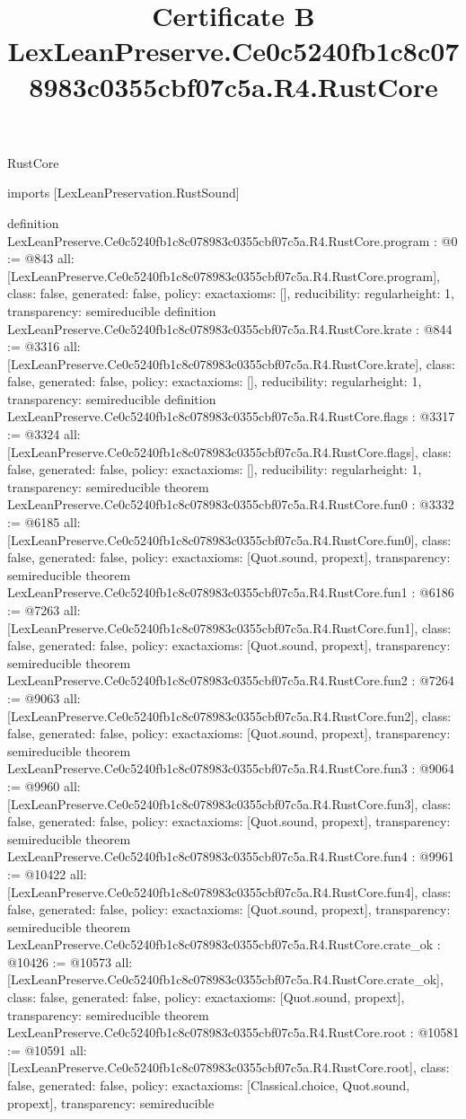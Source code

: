 \begin{lexlean}{RustCore}
\title{Certificate B LexLeanPreserve.Ce0c5240fb1c8c078983c0355cbf07c5a.R4.RustCore}
\begin{coremodule}
imports [LexLeanPreservation.RustSound]

definition LexLeanPreserve.Ce0c5240fb1c8c078983c0355cbf07c5a.R4.RustCore.program : @0 := @843 {
  all: [LexLeanPreserve.Ce0c5240fb1c8c078983c0355cbf07c5a.R4.RustCore.program],
  class: false,
  generated: false,
  policy: exact{axioms: []},
  reducibility: regular{height: 1},
  transparency: semireducible
}
definition LexLeanPreserve.Ce0c5240fb1c8c078983c0355cbf07c5a.R4.RustCore.krate : @844 := @3316 {
  all: [LexLeanPreserve.Ce0c5240fb1c8c078983c0355cbf07c5a.R4.RustCore.krate],
  class: false,
  generated: false,
  policy: exact{axioms: []},
  reducibility: regular{height: 1},
  transparency: semireducible
}
definition LexLeanPreserve.Ce0c5240fb1c8c078983c0355cbf07c5a.R4.RustCore.flags : @3317 := @3324 {
  all: [LexLeanPreserve.Ce0c5240fb1c8c078983c0355cbf07c5a.R4.RustCore.flags],
  class: false,
  generated: false,
  policy: exact{axioms: []},
  reducibility: regular{height: 1},
  transparency: semireducible
}
theorem LexLeanPreserve.Ce0c5240fb1c8c078983c0355cbf07c5a.R4.RustCore.fun0 : @3332 := @6185 {
  all: [LexLeanPreserve.Ce0c5240fb1c8c078983c0355cbf07c5a.R4.RustCore.fun0],
  class: false,
  generated: false,
  policy: exact{axioms: [Quot.sound, propext]},
  transparency: semireducible
}
theorem LexLeanPreserve.Ce0c5240fb1c8c078983c0355cbf07c5a.R4.RustCore.fun1 : @6186 := @7263 {
  all: [LexLeanPreserve.Ce0c5240fb1c8c078983c0355cbf07c5a.R4.RustCore.fun1],
  class: false,
  generated: false,
  policy: exact{axioms: [Quot.sound, propext]},
  transparency: semireducible
}
theorem LexLeanPreserve.Ce0c5240fb1c8c078983c0355cbf07c5a.R4.RustCore.fun2 : @7264 := @9063 {
  all: [LexLeanPreserve.Ce0c5240fb1c8c078983c0355cbf07c5a.R4.RustCore.fun2],
  class: false,
  generated: false,
  policy: exact{axioms: [Quot.sound, propext]},
  transparency: semireducible
}
theorem LexLeanPreserve.Ce0c5240fb1c8c078983c0355cbf07c5a.R4.RustCore.fun3 : @9064 := @9960 {
  all: [LexLeanPreserve.Ce0c5240fb1c8c078983c0355cbf07c5a.R4.RustCore.fun3],
  class: false,
  generated: false,
  policy: exact{axioms: [Quot.sound, propext]},
  transparency: semireducible
}
theorem LexLeanPreserve.Ce0c5240fb1c8c078983c0355cbf07c5a.R4.RustCore.fun4 : @9961 := @10422 {
  all: [LexLeanPreserve.Ce0c5240fb1c8c078983c0355cbf07c5a.R4.RustCore.fun4],
  class: false,
  generated: false,
  policy: exact{axioms: [Quot.sound, propext]},
  transparency: semireducible
}
theorem LexLeanPreserve.Ce0c5240fb1c8c078983c0355cbf07c5a.R4.RustCore.crate_ok : @10426 := @10573 {
  all: [LexLeanPreserve.Ce0c5240fb1c8c078983c0355cbf07c5a.R4.RustCore.crate_ok],
  class: false,
  generated: false,
  policy: exact{axioms: [Quot.sound, propext]},
  transparency: semireducible
}
theorem LexLeanPreserve.Ce0c5240fb1c8c078983c0355cbf07c5a.R4.RustCore.root : @10581 := @10591 {
  all: [LexLeanPreserve.Ce0c5240fb1c8c078983c0355cbf07c5a.R4.RustCore.root],
  class: false,
  generated: false,
  policy: exact{axioms: [Classical.choice, Quot.sound, propext]},
  transparency: semireducible
}


\end{coremodule}
\end{lexlean}
